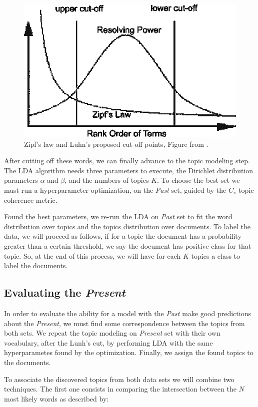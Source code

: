 \begin{figure}[h!]
	\centering
	\includegraphics[width=0.55\linewidth]{01.Chapters/04.Materials/Zipfs-law-and-Luhns-proposed-cut-off-points}
	\caption{Zipf’s law and Luhn’s proposed cut-off points, Figure from \cite{cummins2006evolving}.}
	\label{fig:zipfs-law-and-luhns-proposed-cut-off-points}
\end{figure}

After cutting off these words, we can finally advance to the topic modeling step. The LDA algorithm needs three parameters to execute, the Dirichlet distribution parameters $\alpha$ and $\beta$, and the numbers of topics $K$. To choose the best set we must run a hyperparameter optimization, on the \textit{Past} set, guided by the $C_{v}$ topic coherence metric.

Found the best parameters, we re-run the LDA on \textit{Past} set to fit the word distribution over topics and the topics distribution over documents. To label the data, we will proceed as follows, if for a topic the document has a probability greater than a certain threshold, we say the document has positive class for that topic. So, at the end of this process, we will have for each $K$ topics a class to label the documents.

\subsection{Evaluating the \textit{Present}}\label{sec:material-combination}

In order to evaluate the ability for a model with the \textit{Past} make good predictions about the \textit{Present}, we must find some correspondence between the topics from both sets. We repeat the topic modeling on \textit{Present} set with their own vocabulary, after the Lunh's cut, by performing LDA with the same hyperparametes found by the optimization. Finally, we assign the found topics to the documents.

To associate the discovered topics from both data sets we will combine two techniques. The first one consists in comparing the intersection between the $N$ most likely words as described by:

